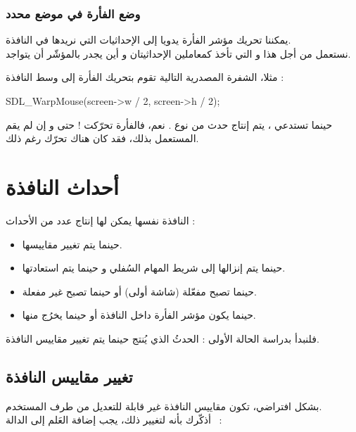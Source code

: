 \subsubsection{وضع الفأرة في موضع محدد}

يمكننا تحريك مؤشر الفأرة يدويا إلى الإحداثيات التي نريدها في النافذة.\\
نستعمل من أجل هذا
و التي تأخذ كمعاملين الإحداثيتان
و 
أين يجدر بالمؤشّر أن يتواجد.

مثلا، الشفرة المصدرية التالية تقوم بتحريك الفأرة إلى وسط النافذة :

\begin{Csource}
SDL_WarpMouse(screen->w / 2, screen->h / 2);
\end{Csource}

\begin{information}
حينما تستدعي
،
يتم إنتاج حدث من نوع
.
نعم، فالفأرة تحرّكت ! حتى و إن لم يقم المستعمل بذلك، فقد كان هناك تحرّك رغم ذلك.
\end{information}

\section{أحداث النافذة}

النافذة نفسها يمكن لها إنتاج عدد من الأحداث :

\begin{itemize}
	\item حينما يتم تغيير مقاييسها.
	\item حينما يتم إنزالها إلى شريط المهام السُفلي و حينما يتم استعادتها.
	\item حينما تصبح مفعّلة (شاشة أولى) أو حينما تصبح غير مفعلة.
	\item حينما يكون مؤشر الفأرة داخل النافذة أو حينما يخرُج منها.
\end{itemize}

فلنبدأ بدراسة الحالة الأولى : الحدثُ الذي يُنتج حينما يتم تغيير مقاييس النافذة.

\subsection{تغيير مقاييس النافذة}

بشكل افتراضي، تكون مقاييس النافذة غير قابلة للتعديل من طرف المستخدم.\\
أذكّرك بأنه لتغيير ذلك، يجب إضافة العَلم
إلى الدالة
~:

